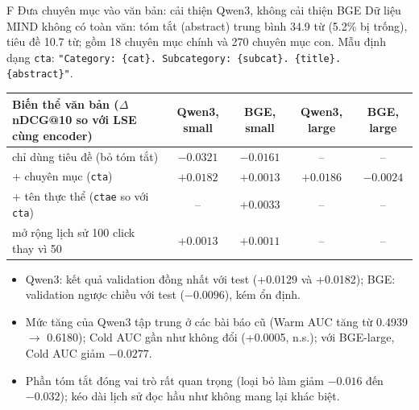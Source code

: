 \documentclass[aspectratio=169,t]{beamer}
\newcommand{\code}[1]{\texttt{#1}}
\begin{document}
\begin{frame}[shrink]{F \textperiodcentered{} Đưa chuyên mục vào văn bản: cải thiện Qwen3, không cải thiện BGE}
\scriptsize
Dữ liệu MIND không có toàn văn: tóm tắt (abstract) trung bình 34.9 từ (5.2\% bị trống), tiêu đề 10.7 từ; gồm 18 chuyên mục chính và 270 chuyên mục con.
Mẫu định dạng \code{cta}: \code{"Category: \{cat\}. Subcategory: \{subcat\}. \{title\}. \{abstract\}"}.\par\vspace{1pt}
\renewcommand{\arraystretch}{1.07}
\begin{tabularx}{\textwidth}{@{}Ycccc@{}}
\toprule
\textbf{Biến thể văn bản ($\Delta$ nDCG@10 so với LSE cùng encoder)} & \textbf{Qwen3, small} & \textbf{BGE, small} & \textbf{Qwen3, large} & \textbf{BGE, large}\\
\midrule
chỉ dùng tiêu đề (bỏ tóm tắt) & $-0.0321$ & $-0.0161$ & -- & --\\
+ chuyên mục (\code{cta}) & $\mathbf{+0.0182}$ & $+0.0013$ & $\mathbf{+0.0186}$ & $-0.0024$\\
+ tên thực thể (\code{ctae} so với \code{cta}) & -- & $+0.0033$ & -- & --\\
mở rộng lịch sử 100 click thay vì 50 & $+0.0013$ & $+0.0011$ & -- & --\\
\bottomrule
\end{tabularx}
\begin{itemize}
  \setlength{\itemsep}{1pt}
  \item Qwen3: kết quả validation đồng nhất với test (+0.0129 và +0.0182); BGE: validation ngược chiều với test ($-0.0096$), kém ổn định.
  \item Mức tăng của Qwen3 tập trung ở các bài báo cũ (Warm AUC tăng từ 0.4939 $\to$ 0.6180); Cold AUC gần như không đổi (+0.0005, n.s.); với BGE-large, Cold AUC giảm $-0.0277$.
  \item Phần tóm tắt đóng vai trò rất quan trọng (loại bỏ làm giảm $-0.016$ đến $-0.032$); kéo dài lịch sử đọc hầu như không mang lại khác biệt.
\end{itemize}
\par\kern0pt%
\end{frame}
\end{document}

